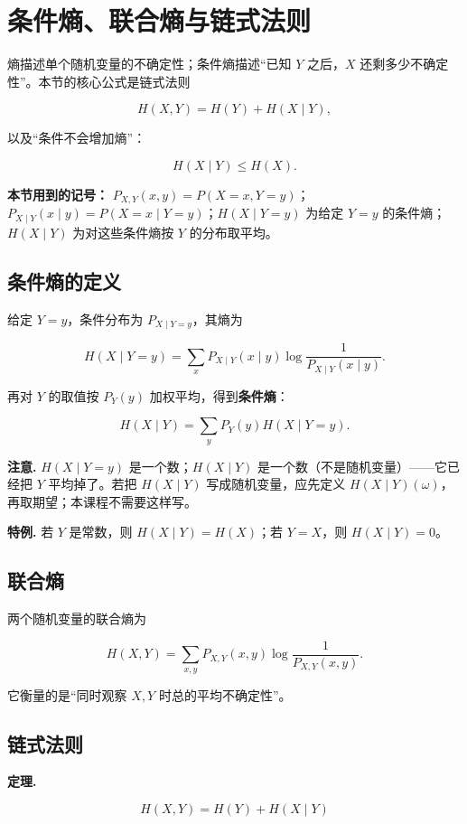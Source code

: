 \section{条件熵、联合熵与链式法则}


熵描述单个随机变量的不确定性；条件熵描述“已知 $Y$ 之后，$X$ 还剩多少不确定性”。本节的核心公式是链式法则

\[
H(X,Y)=H(Y)+H(X\mid Y),
\]

以及“条件不会增加熵”：

\[
H(X\mid Y)\le H(X).
\]

\textbf{本节用到的记号：} $P_{X,Y}(x,y)=P(X=x,Y=y)$；$P_{X\mid Y}(x\mid y)=P(X=x\mid Y=y)$；$H(X\mid Y=y)$ 为给定 $Y=y$ 的条件熵；$H(X\mid Y)$ 为对这些条件熵按 $Y$ 的分布取平均。

\subsection{条件熵的定义}


给定 $Y=y$，条件分布为 $P_{X\mid Y=y}$，其熵为

\[
H(X\mid Y=y)
=\sum_xP_{X\mid Y}(x\mid y)\log\frac1{P_{X\mid Y}(x\mid y)}.
\]

再对 $Y$ 的取值按 $P_Y(y)$ 加权平均，得到\textbf{条件熵}：

\[
H(X\mid Y)
=\sum_yP_Y(y)H(X\mid Y=y).
\]

\textbf{注意.} $H(X\mid Y=y)$ 是一个数；$H(X\mid Y)$ 是一个数（不是随机变量）——它已经把 $Y$ 平均掉了。若把 $H(X\mid Y)$ 写成随机变量，应先定义 $H(X\mid Y)(\omega)$，再取期望；本课程不需要这样写。

\textbf{特例.} 若 $Y$ 是常数，则 $H(X\mid Y)=H(X)$；若 $Y=X$，则 $H(X\mid Y)=0$。

\subsection{联合熵}


两个随机变量的联合熵为

\[
H(X,Y)
=\sum_{x,y}P_{X,Y}(x,y)\log\frac1{P_{X,Y}(x,y)}.
\]

它衡量的是“同时观察 $X,Y$ 时总的平均不确定性”。

\subsection{链式法则}


\textbf{定理.}

\[
\boxed{
H(X,Y)=H(Y)+H(X\mid Y)
}
\]

